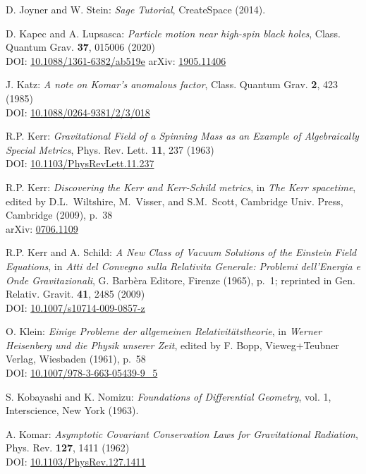\begin{thebibliography}{123}
D. Joyner and W. Stein: {\em Sage Tutorial}, CreateSpace (2014).

D. Kapec and A. Lupsasca:
{\em Particle motion near high-spin black holes},
Class. Quantum Grav. {\bf 37}, 015006 (2020)\\
DOI: \href{https://doi.org/10.1088/1361-6382/ab519e}{10.1088/1361-6382/ab519e}\hfill
arXiv: \href{https://arxiv.org/abs/1905.11406}{1905.11406}

J. Katz:
{\em A note on Komar's anomalous factor},
Class. Quantum Grav. {\bf 2}, 423 (1985)\\
DOI: \href{https://doi.org/10.1088/0264-9381/2/3/018}{10.1088/0264-9381/2/3/018}

R.P. Kerr:
{\em Gravitational Field of a Spinning Mass as an Example of Algebraically Special Metrics},
Phys. Rev. Lett. {\bf 11}, 237 (1963)\\
DOI: \href{https://doi.org/10.1103/PhysRevLett.11.237}{10.1103/PhysRevLett.11.237}

R.P. Kerr: {\em Discovering the Kerr and Kerr-Schild metrics},
in {\em The Kerr spacetime}, edited by D.L.~Wiltshire, M.~Visser, and S.M.~Scott,
Cambridge Univ. Press, Cambridge (2009), p.~38\\
arXiv: \href{https://arxiv.org/abs/0706.1109}{0706.1109}

R.P. Kerr and A. Schild:
{\em A New Class of Vacuum Solutions of the Einstein Field Equations},
in {\em Atti del Convegno sulla Relativita Generale: Problemi
dell’Energia e Onde Gravitazionali}, G. Barbèra Editore,
Firenze (1965), p.~1; reprinted in
Gen. Relativ. Gravit. {\bf 41}, 2485 (2009)\\
DOI: \href{https://doi.org/10.1007/s10714-009-0857-z}{10.1007/s10714-009-0857-z}

O. Klein:
{\em Einige Probleme der allgemeinen Relativitätstheorie},
in {\em Werner Heisenberg und die Physik unserer Zeit},
edited by F. Bopp, Vieweg+Teubner Verlag, Wiesbaden (1961), p.~58\\
DOI: \href{https://doi.org/10.1007/978-3-663-05439-9_5}{10.1007/978-3-663-05439-9\_5}

S. Kobayashi and K. Nomizu:
{\em Foundations of Differential Geometry}, vol. 1,
Interscience, New York (1963).

A. Komar:
{\em Asymptotic Covariant Conservation Laws for Gravitational Radiation},
Phys. Rev. {\bf 127}, 1411 (1962)\\
DOI: \href{https://doi.org/10.1103/PhysRev.127.1411}{10.1103/PhysRev.127.1411}


\end{thebibliography}
